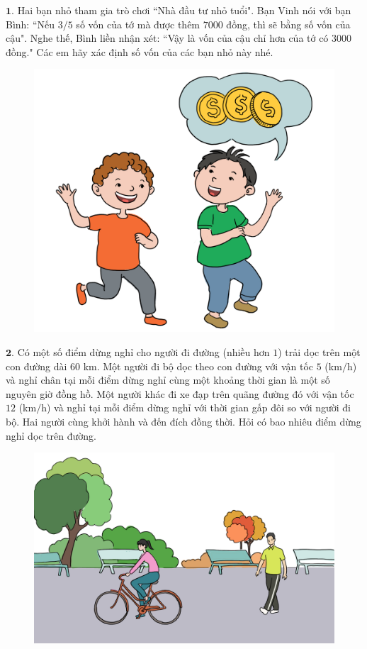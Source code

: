 \begin{multicols}{2}
	$\pmb{1.}$ Hai bạn nhỏ tham gia trò chơi ``Nhà đầu tư nhỏ tuổi". Bạn Vinh nói với bạn Bình: ``Nếu $3/5$ số vốn của tớ mà được thêm $7000$ đồng, thì sẽ bằng số vốn của cậu". Nghe thế, Bình liền  nhận xét: ``Vậy là vốn của cậu chỉ hơn của tớ có $3000$ đồng." Các em hãy xác định số vốn của các bạn nhỏ này nhé.
	\begin{figure}[H]
		\vspace*{-5pt}
		\centering
		\captionsetup{labelformat= empty, justification=centering}
		\includegraphics[width= 0.85\linewidth]{bai1}
		\vspace*{-15pt}
	\end{figure}
	$\pmb{2.}$ Có một số điểm dừng nghỉ cho người đi đường (nhiều hơn $1$) trải dọc trên một con đường dài $60$ km. Một người đi bộ dọc theo con đường với vận tốc $5$ (km$/$h) và nghỉ chân tại mỗi điểm dừng nghỉ cùng một khoảng thời gian là một số nguyên giờ đồng hồ. Một người khác đi xe đạp trên quãng đường đó với vận tốc $12$ (km$/$h) và nghỉ tại mỗi điểm dừng nghỉ với thời gian gấp đôi so với người đi bộ. Hai người cùng khởi hành và đến đích đồng thời. Hỏi có bao nhiêu điểm dừng nghỉ dọc trên đường.
	\begin{figure}[H]
		\vspace*{-5pt}
		\centering
		\captionsetup{labelformat= empty, justification=centering}
		\includegraphics[width= 1\linewidth]{bai2}

\end{figure}
\end{multicols}
